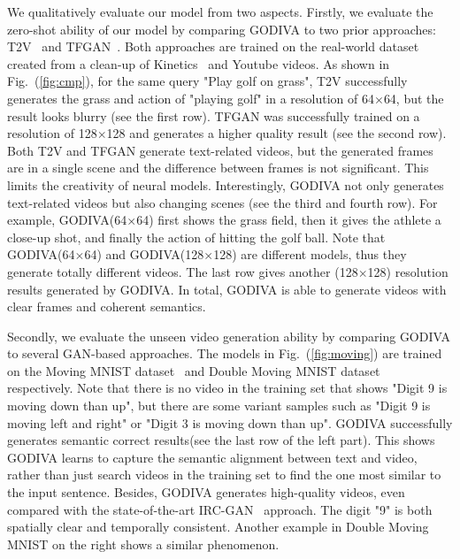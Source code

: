 \documentclass{article}
\begin{document}
We qualitatively evaluate our model from two aspects. 
Firstly, we evaluate the zero-shot ability of our model by comparing GODIVA to two prior approaches: T2V~\cite{liVideoGenerationText2018} and TFGAN~\cite{balajiConditionalGANDiscriminative2019}. Both approaches are trained on the real-world dataset created from a clean-up of  Kinetics~\cite{kayKineticsHumanAction2017} and Youtube videos. As shown in Fig.~(\ref{fig:cmp}), for the same query "Play golf on grass", T2V successfully generates the grass and action of "playing golf" in a resolution of 64$\times$64, but the result looks blurry (see the first row). TFGAN was successfully trained on a resolution of 128$\times$128 and generates a higher quality result (see the second row).  Both T2V and TFGAN generate text-related videos, but the generated frames are in a single scene and the difference between frames is not significant. This limits the creativity of neural models. Interestingly, GODIVA not only generates text-related videos but also changing scenes (see the third and fourth row). For example, GODIVA(64$\times$64) first shows the grass field, then it gives the athlete a close-up shot, and finally the action of hitting the golf ball. Note that GODIVA(64$\times$64) and GODIVA(128$\times$128) are different models, thus they generate totally different videos.  The last row gives another (128$\times$128) resolution results generated by GODIVA. In total, GODIVA is able to generate videos with clear frames and coherent semantics.

Secondly, we evaluate the unseen video generation ability by comparing GODIVA to several GAN-based approaches. The models in Fig.~(\ref{fig:moving}) are trained on the Moving MNIST dataset~\cite{mittalSyncdrawAutomaticVideo2017} and Double Moving MNIST dataset~\cite{mittalSyncdrawAutomaticVideo2017} respectively. Note that there is no video in the training set that shows "Digit 9 is moving down than up", but there are some variant samples such as "Digit 9 is moving left and right" or "Digit 3 is moving down than up". GODIVA successfully generates semantic correct results(see the last row of the left part). This shows GODIVA learns to capture the semantic alignment between text and video, rather than just search videos in the training set to find the one most similar to the input sentence. Besides, GODIVA generates high-quality videos, even compared with the state-of-the-art IRC-GAN~\cite{mittalSyncdrawAutomaticVideo2017} approach. The digit "9" is both spatially clear and temporally consistent. Another example in Double Moving MNIST on the right shows a similar phenomenon.
\end{document}

